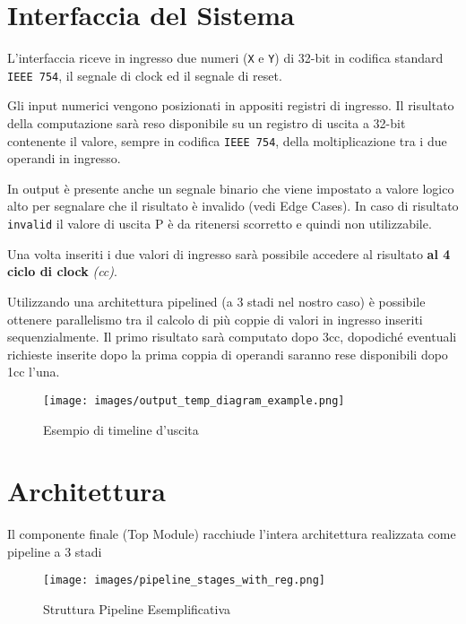 \documentclass[twoside,11pt]{article}
\begin{document}
{\newpage

\section{Interfaccia del Sistema}
L'interfaccia riceve in ingresso due numeri (\verb|X| e \verb|Y|) di 32-bit in codifica standard \verb|IEEE 754|, il segnale di clock ed il segnale di reset.

Gli input numerici vengono posizionati in appositi registri di ingresso. Il risultato della computazione sarà reso disponibile su un registro di uscita a 32-bit contenente il valore, sempre in codifica \verb|IEEE 754|, della moltiplicazione tra i due operandi in ingresso.

In output è presente anche un segnale binario che viene impostato a valore logico alto per segnalare che il risultato è invalido (vedi Edge Cases). In caso di risultato \verb|invalid| il valore di uscita P è da ritenersi scorretto e quindi non utilizzabile.

Una volta inseriti i due valori di ingresso sarà possibile accedere al risultato \textbf{al 4 ciclo di clock} \textit{(cc)}.

Utilizzando una architettura pipelined (a 3 stadi nel nostro caso) è possibile ottenere parallelismo tra il calcolo di più coppie di valori in ingresso inseriti sequenzialmente. Il primo risultato sarà computato dopo 3cc, dopodiché eventuali richieste inserite dopo la prima coppia di operandi saranno rese disponibili dopo 1cc l’una.

\begin{figure}[h!]
    \centering
    \texttt{[image: images/output\_temp\_diagram\_example.png]}
    \caption{Esempio di timeline d'uscita}
    \label{fig:output-timeline}
\end{figure}

\newpage

\section{Architettura}
Il componente finale (Top Module) racchiude l’intera architettura realizzata come pipeline a 3 stadi
\begin{figure}[h!]
    \centering
    \texttt{[image: images/pipeline\_stages\_with\_reg.png]}
    \caption{Struttura Pipeline Esemplificativa}
    \label{fig:struttura-pipeline}
\end{figure}

}
\end{document}
